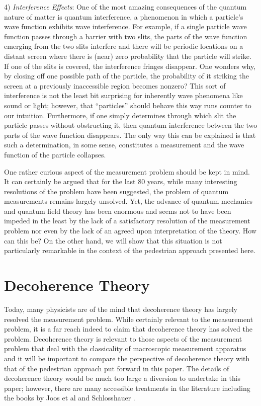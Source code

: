 \documentclass [12pt]{revtex4}
\begin{document}
4) \textit{Interference Effects}:  One of the most amazing
consequences of the quantum nature of matter is quantum
interference, a phenomenon in which a particle's wave function
exhibits wave interference.  For example, if a single particle wave
function passes through a barrier with two slits, the parts of the
wave function emerging from the two slits interfere and there will
be periodic locations on a distant screen where there is (near) zero
probability that the particle will strike. If one of the slits is
covered, the interference fringes disappear. One wonders why, by
closing off one possible path of the particle, the probability of
it striking the screen at a previously inaccessible region becomes
nonzero? This sort of interference is not the
least bit surprising for inherently wave phenomena like sound or
light; however, that ``particles'' should behave this way runs
counter to our intuition. Furthermore, if one simply determines
through which slit the particle passes without obstructing it, then
quantum interference between the two parts of the wave function
disappears. The only way this can be explained is that such a
determination, in some sense, constitutes a measurement and the wave
function of the particle collapses.

One rather curious aspect of the measurement problem should be kept
in mind. It can certainly be argued that for the last 80 years,
while many interesting resolutions of the problem have been
suggested, the problem of quantum measurements remains largely
unsolved. Yet, the advance of quantum mechanics and quantum field
theory has been enormous and seems not to have been impeded in the
least by the lack of a satisfactory resolution of the measurement
problem nor even by the lack of an agreed upon interpretation of the
theory. How can this be? On the other hand, we will show that this
situation is not particularly remarkable in the context of the
pedestrian approach presented here.

\section{Decoherence Theory}

Today, many physicists are of the mind that decoherence theory
has largely resolved the measurement problem. While certainly
relevant to the measurement problem, it is a far reach indeed to
claim that decoherence theory has solved the problem. Decoherence
theory is relevant to those aspects of the measurement problem that
deal with the classicality of macroscopic measurement apparatus and
it will be important to compare the perspective of decoherence
theory with that of the pedestrian approach put forward in this
paper. The details of decoherence theory would be much too large a
diversion to undertake in this paper; however, there are many
accessible treatments in the literature including the books by Joos
et al \cite{J2003} and Schlosshauer \cite{S2007}.
\end{document}
